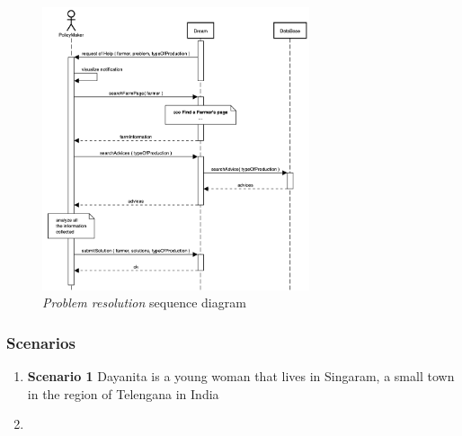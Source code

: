 \begin{enumerate}
\begin{figure}[H]
\begin{center}
        \includegraphics[width=0.7\textwidth]{sequence/replyHelp.png}
        \caption{\emph{Problem resolution} sequence diagram}
        \label{fig:sequence13}
        \end{center}
    \end{figure}
\end{enumerate}

\subsubsection{Scenarios}
\begin{enumerate}
    \item \textbf{Scenario 1}
    Dayanita is a young woman that lives in Singaram, a small town in the region of Telengana in India
    \item 
\end{enumerate}


